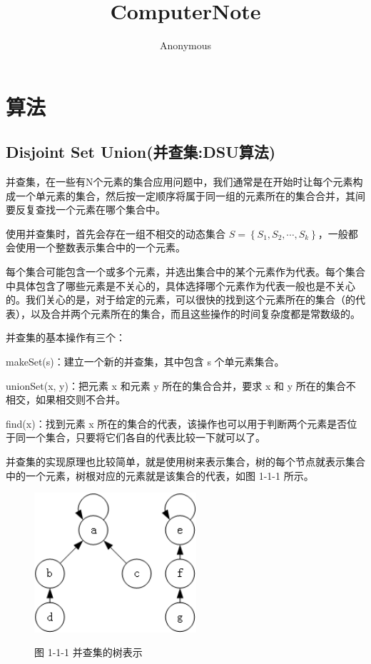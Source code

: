 \documentclass[12pt]{article}  %
\author{Anonymous}
\title{\Huge ComputerNote}
\date{}
\begin{document}

\maketitle

\renewcommand{\contentsname}{\large Contents}
\tableofcontents

\section{算法}

\subsection{Disjoint Set Union(并查集:DSU算法)}

并查集，在一些有N个元素的集合应用问题中，我们通常是在开始时让每个元素构成一个单元素的集合，然后按一定顺序将属于同一组的元素所在的集合合并，其间要反复查找一个元素在哪个集合中。

使用并查集时，首先会存在一组不相交的动态集合 $S = \left\{ {{S_1},{S_2}, \cdots ,{S_k}} \right\}$，一般都会使用一个整数表示集合中的一个元素。

每个集合可能包含一个或多个元素，并选出集合中的某个元素作为代表。每个集合中具体包含了哪些元素是不关心的，具体选择哪个元素作为代表一般也是不关心的。我们关心的是，对于给定的元素，可以很快的找到这个元素所在的集合（的代表），以及合并两个元素所在的集合，而且这些操作的时间复杂度都是常数级的。

并查集的基本操作有三个：

makeSet(s)：建立一个新的并查集，其中包含 s 个单元素集合。

unionSet(x, y)：把元素 x 和元素 y 所在的集合合并，要求 x 和 y 所在的集合不相交，如果相交则不合并。

find(x)：找到元素 x 所在的集合的代表，该操作也可以用于判断两个元素是否位于同一个集合，只要将它们各自的代表比较一下就可以了。

并查集的实现原理也比较简单，就是使用树来表示集合，树的每个节点就表示集合中的一个元素，树根对应的元素就是该集合的代表，如图 1-1-1 所示。

\begin{figure}[h]
\centering
\includegraphics[width = 6cm ]{1-1-1.png}

图 1-1-1 并查集的树表示
\end{figure}
\end{document}
